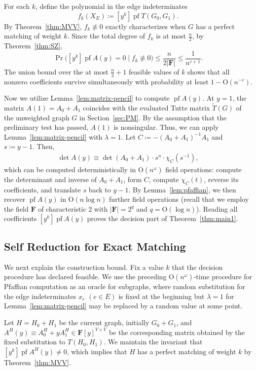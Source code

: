 \documentclass[11pt, a4paper]{article}
\theoremstyle{plain}
\theoremstyle{definition}
\theoremstyle{remark}
\newcommand{\bF}{\mathbf{F}}
\DeclareMathOperator{\pf}{pf}
\begin{document}
For each $k$, define the polynomial in the edge indeterminates
\[f_k(X_E)\coloneqq[y^k]\pf T(G_0,G_1).\]
By Theorem~\ref{thm:MVV}, $f_k\not\equiv0$ exactly characterizes when $G$ has a perfect matching of weight $k$.
Since the total degree of $f_k$ is at most $\frac{n}{2}$, by Theorem~\ref{thm:SZ},
\[\Pr\bigl([y^k]\pf A(y)=0 \mid f_k\not\equiv0\bigr) \le \frac{n}{2|\bF|} \le \frac{1}{n^{c+1}}.\]
The union bound over the at most $\frac{n}{2}+1$ feasible values of $k$ shows that all nonzero coefficients survive simultaneously with probability at least $1-\mathrm{O}(n^{-c})$.

Now we utilize Lemma~\ref{lem:matrix-pencil} to compute $\pf A(y)$.
At $y=1$, the matrix $A(1)=A_0+A_1$ coincides with the evaluated Tutte matrix $\tilde{T}(G)$ of the unweighted graph $G$ in Section~\ref{sec:PM}.
By the assumption that the preliminary test has passed, $A(1)$ is nonsingular.
Thus, we can apply Lemma~\ref{lem:matrix-pencil} with $\lambda=1$.
Let $C\coloneqq -(A_0+A_1)^{-1}A_1$ and $s \coloneqq y-1$.
Then,
\begin{align*}\label{eq:exact-pencil}
\det A(y) \equiv \det(A_0+A_1) \cdot s^n \cdot \chi_C(s^{-1}),
\end{align*}
which can be computed deterministically in $\mathrm{O}(n^\omega)$ field operations: compute the determinant and inverse of $A_0+A_1$, form $C$, compute $\chi_C(t)$, reverse its coefficients, and translate $s$ back to $y-1$.
By Lemma~\ref{lem:pfaffian}, we then recover $\pf A(y)$ in $\mathrm{O}(n \log n)$ further field operations (recall that we employ the field $\bF$ of characteristic $2$ with $|\bF| = 2^q$ and $q = \mathrm{O}(\log n)$).
Reading all coefficients $[y^k]\pf A(y)$ proves the decision part of Theorem~\ref{thm:main1}.



\subsection{Self Reduction for Exact Matching}\label{sec:self-reduction}
We next explain the construction bound.
Fix a value $k$ that the decision procedure has declared feasible.
We use the preceding $\mathrm{O}(n^\omega)$-time procedure for Pfaffian computation as an oracle for subgraphs, where random substitution for the edge indeterminates $x_e$ $(e \in E)$ is fixed at the beginning but $\lambda = 1$ for Lemma~\ref{lem:matrix-pencil} may be replaced by a random value at some point.

Let $H=H_0+H_1$ be the current graph, initially $G_0+G_1$, and $A^{H}(y) \equiv A^H_0 + yA^H_1 \in \bF[y]^{V \times V}$ be the corresponding matrix obtained by the fixed substitution to $T(H_0, H_1)$.
We maintain the invariant that $[y^k]\pf A^H(y) \neq 0$, which implies that $H$ has a perfect matching of weight $k$ by Theorem~\ref{thm:MVV}.
\end{document}
